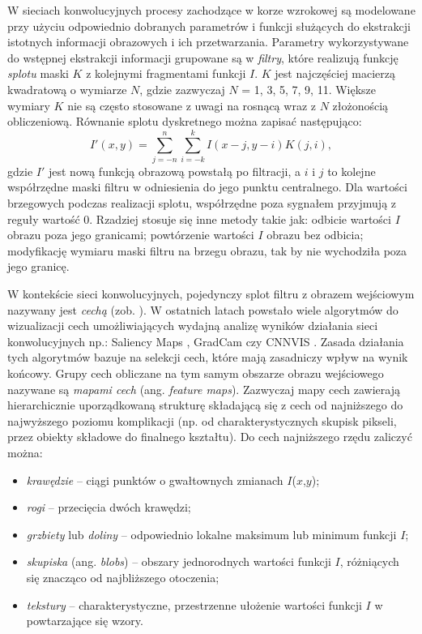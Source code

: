 W sieciach konwolucyjnych procesy zachodzące w korze wzrokowej są modelowane przy użyciu odpowiednio dobranych parametrów i funkcji służących do ekstrakcji istotnych informacji obrazowych i ich przetwarzania.  Parametry wykorzystywane do wstępnej ekstrakcji informacji grupowane są w \textit{filtry}, które realizują funkcję \textit{splotu} maski $K$ z kolejnymi fragmentami funkcji $I$. $K$ jest najczęściej macierzą kwadratową o wymiarze $N$, gdzie zazwyczaj $N$ = {1, 3, 5, 7, 9, 11}. Większe wymiary $K$ nie są często stosowane z uwagi na rosnącą wraz z $N$ złożonością obliczeniową. Równanie splotu dyskretnego można zapisać następująco:
\begin{equation}
	I'\left(x, y\right) = \sum_{j=-n}^{n} \sum_{i=-k}^{k} I\left(x - j, y - i \right)K\left(j, i\right),
\end{equation}
gdzie $I'$ jest nową funkcją obrazową powstałą po filtracji, a $i$ i $j$ to kolejne współrzędne maski filtru w odniesienia do jego punktu centralnego. Dla wartości brzegowych podczas realizacji splotu, współrzędne poza sygnałem przyjmują z reguły wartość 0. Rzadziej stosuje się inne metody takie jak: odbicie wartości $I$ obrazu poza jego granicami; powtórzenie wartości $I$ obrazu bez odbicia; modyfikację wymiaru maski filtru na brzegu obrazu, tak by nie wychodziła poza jego granicę.

W kontekście sieci konwolucyjnych, pojedynczy splot filtru z obrazem wejściowym nazywany jest \textit{cechą} (zob. \cite{Hijazi2015}). W ostatnich latach powstało wiele algorytmów do wizualizacji cech umożliwiających wydajną analizę wyników działania sieci konwolucyjnych np.: Saliency Maps \cite{DBLP:journals/corr/SimonyanVZ13}, GradCam \cite{DBLP:journals/corr/SelvarajuDVCPB16} czy CNNVIS \cite{DBLP:journals/corr/LiuSLLZL16}. Zasada działania tych algorytmów bazuje na selekcji cech, które mają zasadniczy wpływ na wynik końcowy. Grupy cech obliczane na tym samym obszarze obrazu wejściowego nazywane są \textit{mapami cech} (ang. \textit{feature maps}). Zazwyczaj mapy cech zawierają hierarchicznie uporządkowaną strukturę składającą się z cech od najniższego do najwyższego poziomu komplikacji (np. od charakterystycznych skupisk pikseli, przez obiekty składowe do finalnego kształtu). Do cech najniższego rzędu zaliczyć można:
\begin{itemize}
	\item \textit{krawędzie} -- ciągi punktów o gwałtownych zmianach $I$($x$,$y$);
	\item \textit{rogi} -- przecięcia dwóch krawędzi;
	\item \textit{grzbiety} lub \textit{doliny} -- odpowiednio lokalne maksimum lub minimum funkcji $I$;
	\item \textit{skupiska} (ang. \textit{blobs}) -- obszary jednorodnych wartości funkcji $I$, różniących się znacząco od najbliższego otoczenia; 
	\item \textit{tekstury} -- charakterystyczne, przestrzenne ułożenie wartości funkcji $I$ w powtarzające się wzory.
\end{itemize}


